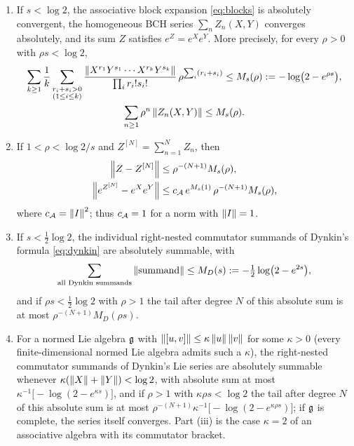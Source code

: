\begin{theorem}\label{thm:convergence}
\begin{enumerate}[label=(\roman*)]
\item If $s<\log2$, the associative block expansion \eqref{eq:blocks} is
absolutely convergent, the homogeneous BCH series $\sum_nZ_n(X,Y)$ converges
absolutely, and its sum $Z$ satisfies $e^Z=e^Xe^Y$. More precisely, for
every $\rho>0$ with $\rho s<\log2$,
\begin{equation}\label{eq:majorant}
\begin{gathered}
 \sum_{k\geq1}\frac1k\sum_{\substack{r_i+s_i>0\\(1\leq i\leq k)}}
 \frac{\left\lVert X^{r_1}Y^{s_1}\cdots X^{r_k}Y^{s_k}\right\rVert}{\prod_ir_i!s_i!}\,\rho^{\sum_i(r_i+s_i)}
 \leq M_s(\rho):=-\log\bigl(2-e^{\rho s}\bigr),\\
 \sum_{n\geq1}\rho^n\left\lVert Z_n(X,Y)\right\rVert\leq M_s(\rho).
\end{gathered}
\end{equation}
\item If $1<\rho<\log2/s$ and $Z^{[N]}=\sum_{n=1}^NZ_n$, then
\begin{align}
 \left\lVert Z-Z^{[N]}\right\rVert&\leq \rho^{-(N+1)}M_s(\rho),\label{eq:remainder}\\
 \left\lVert e^{Z^{[N]}}-e^Xe^Y\right\rVert&\leq c_{\mathcal{A}}\,e^{M_s(1)}\,\rho^{-(N+1)}M_s(\rho),
 \label{eq:expremainder}
\end{align}
where $c_{\mathcal{A}}=\left\lVert I\right\rVert^2$; thus $c_{\mathcal{A}}=1$ for a norm with $\left\lVert I\right\rVert=1$.
\item If $s<\tfrac12\log2$, the individual right-nested commutator summands
of Dynkin's formula \eqref{eq:dynkin} are absolutely summable, with
\begin{equation}\label{eq:dynkinradius}
 \sum_{\text{all Dynkin summands}}\left\lVert\text{summand}\right\rVert
 \leq M_D(s):=-\tfrac12\log\bigl(2-e^{2s}\bigr),
\end{equation}
and if $\rho s<\tfrac12\log2$ with $\rho>1$ the tail after degree $N$ of this
absolute sum is at most $\rho^{-(N+1)}M_D(\rho s)$.
\item For a normed Lie algebra $\mathfrak{g}$ with
$\left\lVert[u,v]\right\rVert\leq\kappa\left\lVert u\right\rVert\left\lVert v\right\rVert$ for some $\kappa>0$ (every
finite-dimensional normed Lie algebra admits such a $\kappa$), the
right-nested commutator summands of Dynkin's Lie series are absolutely
summable whenever $\kappa(\left\lVert X\right\rVert+\left\lVert Y\right\rVert)<\log2$, with absolute sum at
most $\kappa^{-1}\bigl[-\log(2-e^{\kappa s})\bigr]$, and if $\rho>1$ with
$\kappa\rho s<\log2$ the tail after degree $N$ of this absolute sum is at
most $\rho^{-(N+1)}\kappa^{-1}\bigl[-\log(2-e^{\kappa\rho s})\bigr]$; if $\mathfrak{g}$
is complete, the series itself converges. Part (iii) is the case
$\kappa=2$ of an associative algebra with its commutator bracket.
\end{enumerate}
\end{theorem}
